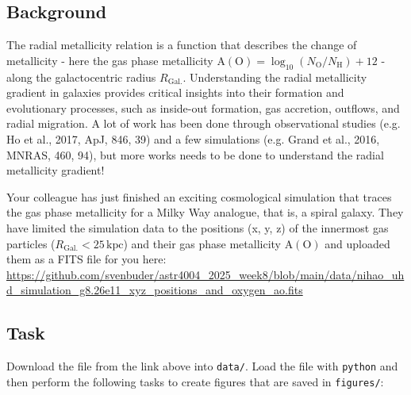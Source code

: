 \documentclass[a4paper,12pt]{article}
\begin{document}
\subsection{Background}

The radial metallicity relation is a function that describes the change of metallicity - here the gas phase metallicity $\mathrm{A(O)} = \log_{10}(N_\mathrm{O}/N_\mathrm{H}) + 12$ - along the galactocentric radius $R_\mathrm{Gal.}$. Understanding the radial metallicity gradient in galaxies provides critical insights into their formation and evolutionary processes, such as inside-out formation, gas accretion, outflows, and radial migration. A lot of work has been done through observational studies (e.g. Ho et al., 2017, ApJ, 846, 39) and a few simulations (e.g. Grand et al., 2016, MNRAS, 460, 94), but more works needs to be done to understand the radial metallicity gradient!

Your colleague has just finished an exciting cosmological simulation that traces the gas phase metallicity for a Milky Way analogue, that is, a spiral galaxy. They have limited the simulation data to the positions (x, y, z) of the innermost gas particles ($R_\mathrm{Gal.} < 25\,\mathrm{kpc}$) and their gas phase metallicity $\mathrm{A(O)}$ and uploaded them as a FITS file for you here: \url{https://github.com/svenbuder/astr4004_2025_week8/blob/main/data/nihao_uhd_simulation_g8.26e11_xyz_positions_and_oxygen_ao.fits}

\subsection{Task}

Download the file from the link above into \texttt{data/}. Load the file with \texttt{python} and then perform the following tasks to create figures that are saved in \texttt{figures/}:
\end{document}
